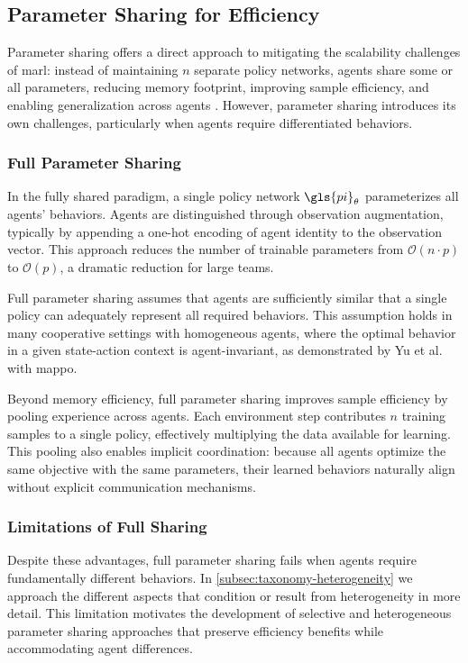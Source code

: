 \subsection{Parameter Sharing for Efficiency}
\label{subsec:parameter-sharing}

Parameter sharing offers a direct approach to mitigating the scalability 
challenges of \gls{marl}: instead of maintaining $n$ separate policy networks, 
agents share some or all parameters, reducing memory footprint, improving 
sample efficiency, and enabling generalization across agents \cite{terry2020}. 
However, parameter sharing introduces its own challenges, particularly when 
agents require differentiated behaviors.

\subsubsection{Full Parameter Sharing}

In the fully shared paradigm, a single policy network \(\gls{pi}_\theta\) 
parameterizes all agents' behaviors. Agents are distinguished through 
observation augmentation, typically by appending a one-hot encoding 
of agent identity to the observation vector. This approach reduces 
the number of trainable parameters from \(\mathcal{O}(n \cdot p)\) 
to \(\mathcal{O}(p)\), a dramatic reduction for large teams.

Full parameter sharing assumes that agents are sufficiently similar 
that a single policy can adequately represent all required behaviors. 
This assumption holds in many cooperative settings with homogeneous agents, 
where the optimal behavior in a given state-action context is agent-invariant,
as demonstrated by Yu et al.~\cite{yu2022} with \gls{mappo}.

Beyond memory efficiency, full parameter sharing improves 
sample efficiency by pooling experience across agents. 
Each environment step contributes \(n\) training samples to a 
single policy, effectively multiplying the data available for learning. 
This pooling also enables implicit coordination: because all agents 
optimize the same objective with the same parameters, their learned 
behaviors naturally align without explicit communication mechanisms.

\subsubsection{Limitations of Full Sharing}

Despite these advantages, full parameter sharing fails 
when agents require fundamentally different behaviors. 
In \cref{subsec:taxonomy-heterogeneity} we approach the different 
aspects that condition or result from heterogeneity in more detail.
This limitation motivates the development of selective and 
heterogeneous parameter sharing approaches that preserve 
efficiency benefits while accommodating agent differences.

